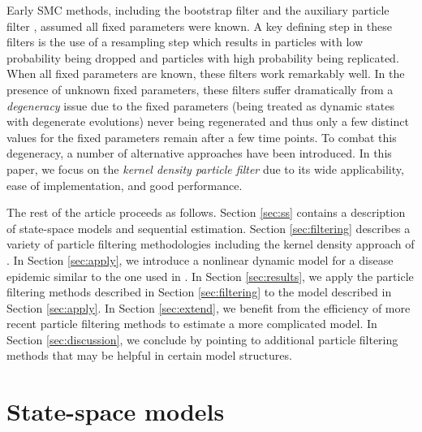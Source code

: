 \documentclass{elsarticle}
\begin{document}
Early SMC methods, including the bootstrap filter \citep{Gord:Salm:Smit:nove:1993,Kita:mont:1996} and the auxiliary particle filter \citep{Pitt:Shep:filt:1999}, assumed all fixed parameters were known. A key defining step in these filters is the use of a resampling step which results in particles with low probability being dropped and particles with high probability being replicated. When all fixed parameters are known, these filters work remarkably well. In the presence of unknown fixed parameters, these filters suffer dramatically from a \emph{degeneracy} issue due to the fixed parameters (being treated as dynamic states with degenerate evolutions) never being regenerated and thus only a few distinct values for the fixed parameters remain after a few time points. To combat this degeneracy, a number of alternative approaches have been introduced. In this paper, we focus on the \emph{kernel density particle filter} \citep{Liu:West:comb:2001} due to its wide applicability, ease of implementation, and good performance. 

The rest of the article proceeds as follows. Section \ref{sec:ss} contains a description of state-space models and sequential estimation. Section \ref{sec:filtering} describes a variety of particle filtering methodologies including the kernel density approach of \cite{Liu:West:comb:2001}. In Section \ref{sec:apply}, we introduce a nonlinear dynamic model for a disease epidemic similar to the one used in \citet{skvortsov2012monitoring}. In Section \ref{sec:results}, we apply the particle filtering methods described in Section \ref{sec:filtering} to the model described in Section \ref{sec:apply}. In Section \ref{sec:extend}, we benefit from the efficiency of more recent particle filtering methods to estimate a more complicated model. In Section \ref{sec:discussion}, we conclude by pointing to additional particle filtering methods that may be helpful in certain model structures.

\section{State-space models \label{sec:ss}}
\end{document}

